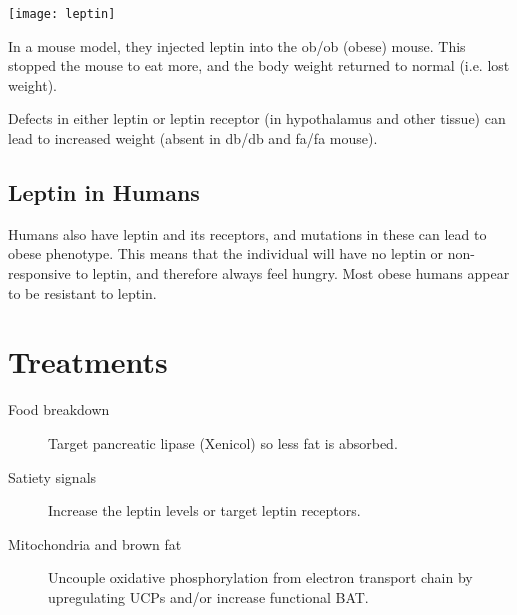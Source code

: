 \begin{center}
\texttt{[image: leptin]}
\end{center}

In a mouse model, they injected leptin into the ob/ob (obese) mouse.
This stopped the mouse to eat more, and the body weight returned to normal (i.e. lost weight).

Defects in either leptin or leptin receptor (in hypothalamus and other tissue) can lead to increased weight (absent in db/db and fa/fa mouse).

\subsection{Leptin in Humans}

Humans also have leptin and its receptors, and mutations in these can lead to obese phenotype.
This means that the individual will have no leptin or non-responsive to leptin, and therefore always feel hungry.
Most obese humans appear to be resistant to leptin.

\section{Treatments}

\begin{description}
\item[Food breakdown] Target pancreatic lipase (Xenicol) so less fat is absorbed.
\item[Satiety signals] Increase the leptin levels or target leptin receptors.
\item[Mitochondria and brown fat] Uncouple oxidative phosphorylation from electron transport chain by upregulating UCPs and/or increase functional BAT.
\end{description}

